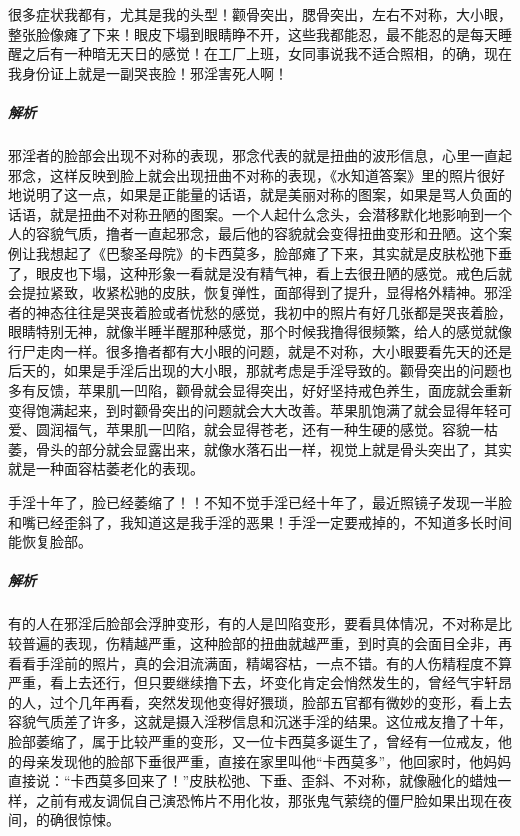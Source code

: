 \begin{case}
    很多症状我都有，尤其是我的头型！颧骨突出，腮骨突出，左右不对称，大小眼，整张脸像瘫了下来！眼皮下塌到眼睛睁不开，这些我都能忍，最不能忍的是每天睡醒之后有一种暗无天日的感觉！在工厂上班，女同事说我不适合照相，的确，现在我身份证上就是一副哭丧脸！邪淫害死人啊！
    \subparagraph{解析} 邪淫者的脸部会出现不对称的表现，邪念代表的就是扭曲的波形信息，心里一直起邪念，这样反映到脸上就会出现扭曲不对称的表现，《水知道答案》里的照片很好地说明了这一点，如果是正能量的话语，就是美丽对称的图案，如果是骂人负面的话语，就是扭曲不对称丑陋的图案。一个人起什么念头，会潜移默化地影响到一个人的容貌气质，撸者一直起邪念，最后他的容貌就会变得扭曲变形和丑陋。这个案例让我想起了《巴黎圣母院》的卡西莫多，脸部瘫了下来，其实就是皮肤松弛下垂了，眼皮也下塌，这种形象一看就是没有精气神，看上去很丑陋的感觉。戒色后就会提拉紧致，收紧松驰的皮肤，恢复弹性，面部得到了提升，显得格外精神。邪淫者的神态往往是哭丧着脸或者忧愁的感觉，我初中的照片有好几张都是哭丧着脸，眼睛特别无神，就像半睡半醒那种感觉，那个时候我撸得很频繁，给人的感觉就像行尸走肉一样。很多撸者都有大小眼的问题，就是不对称，大小眼要看先天的还是后天的，如果是手淫后出现的大小眼，那就考虑是手淫导致的。颧骨突出的问题也多有反馈，苹果肌一凹陷，颧骨就会显得突出，好好坚持戒色养生，面庞就会重新变得饱满起来，到时颧骨突出的问题就会大大改善。苹果肌饱满了就会显得年轻可爱、圆润福气，苹果肌一凹陷，就会显得苍老，还有一种生硬的感觉。容貌一枯萎，骨头的部分就会显露出来，就像水落石出一样，视觉上就是骨头突出了，其实就是一种面容枯萎老化的表现。
\end{case}

\begin{case}
    手淫十年了，脸已经萎缩了！！不知不觉手淫已经十年了，最近照镜子发现一半脸和嘴已经歪斜了，我知道这是我手淫的恶果！手淫一定要戒掉的，不知道多长时间能恢复脸部。
    \subparagraph{解析} 有的人在邪淫后脸部会浮肿变形，有的人是凹陷变形，要看具体情况，不对称是比较普遍的表现，伤精越严重，这种脸部的扭曲就越严重，到时真的会面目全非，再看看手淫前的照片，真的会泪流满面，精竭容枯，一点不错。有的人伤精程度不算严重，看上去还行，但只要继续撸下去，坏变化肯定会悄然发生的，曾经气宇轩昂的人，过个几年再看，突然发现他变得好猥琐，脸部五官都有微妙的变形，看上去容貌气质差了许多，这就是摄入淫秽信息和沉迷手淫的结果。这位戒友撸了十年，脸部萎缩了，属于比较严重的变形，又一位卡西莫多诞生了，曾经有一位戒友，他的母亲发现他的脸部下垂很严重，直接在家里叫他“卡西莫多”，他回家时，他妈妈直接说：“卡西莫多回来了！”皮肤松弛、下垂、歪斜、不对称，就像融化的蜡烛一样，之前有戒友调侃自己演恐怖片不用化妆，那张鬼气萦绕的僵尸脸如果出现在夜间，的确很惊悚。
\end{case}

